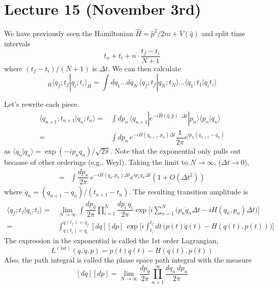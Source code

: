 \section{Lecture 15 (November 3rd)}
\begin{recall}
We have previously seen the Hamiltonian $\hat{H}=\hat{p}^2/2m+V(\hat{q})$ and split time intervals 
\[t_{n}+t_{i}+n\cdot \dfrac{t_{f}-t_{i}}{N+1}\]
where $(t_{f}-t_{i})/(N+1)$ is $\Delta t$. We can then calculate
\[{}_{H}\langle q_{f};t_{f}|q_{i};t_{i}\rangle _{H}=\int dq_{1}\ldots dq_{N}\,\langle q_{f};t_{f}|q_{N};t_{N}\rangle \ldots \langle q_{1};t_{1}|q_{i}t_{i}\rangle \]
\end{recall}
\vspace{2ex}
\begin{lem}
Let's rewrite each piece.
\[\begin{align*}
\langle q_{n+1};t_{n+1}|q_{n};t_{n}\rangle=&\int dp_{n}\,\langle q_{n+1}|e^{-i\hat{H}(\hat{q},\hat{p})\cdot \Delta t}|p_{n}\rangle \langle p_{n}|q_{n}\rangle \\
=&\int dp_{n}\,e^{-iH(q_{n+1},p_{n})\Delta t}\dfrac{1}{2\pi }e^{ip_{n}(q_{n+1}-q_{n})}
\end{align*}\]
as $\langle q_{n}|q_{n}\rangle =\exp (-ip_{n}q_{n})/\sqrt{2\pi }$. Note that the exponential only pulls out because of other orderings (e.g., Weyl). Taking the limit to $N\rightarrow \infty $, ($\Delta t\rightarrow 0$),
\[\begin{align*}
=&\int \dfrac{dp_{n}}{2\pi }\,e^{-iH(q_{n},p_{n})\Delta t}e^{ip_{n}\dot{q}_{n}\Delta t}(1+O(\Delta t^2))
\end{align*}\]
where $\dot{q}_{n}=(q_{n+1}-q_{n})/(t_{n+1}-t_{n})$. The resulting transition amplitude is
\[\begin{align*}
\langle q_{f};t_{f}|q_{i};t_{i}\rangle =&\lim _{N\rightarrow \infty }\int \dfrac{dp_{0}}{2\pi }\prod^{N}_{i=1}\dfrac{dp_{i}\,q_{i}}{2\pi }\exp \Big[i\sum ^{N}_{n=1}\Big(p_{n}\dot{q}_{n}\Delta t-iH(q_{n},p_{n})\Delta t\Big)\Big]\\
=&\int ^{q(t_{f})=q_{f}}_{q(t_{i})=q_{i}}[dq][dp]\,\exp \Big[i\int ^{t_{f}}_{t_{i}}dt\,\Big(p(t)\dot{q}(t)-H(q(t),p(t))\Big)\Big]
\end{align*}\]
The expression in the exponential is called the 1st order Lagrangian,
\[L^{(1\mathrm{st})}(q,\dot{q},p)=p(t)\dot{q}(t)-H(q(t),p(t))\]
Also, the path integral is called the phase space path integral with the measure
\[[dq][dp]=\lim _{N\rightarrow \infty }\dfrac{dp_{0}}{2\pi }\prod^{\infty }_{n=1}\dfrac{dq_{n}\,dp_{n}}{2\pi }\]
\end{lem}
